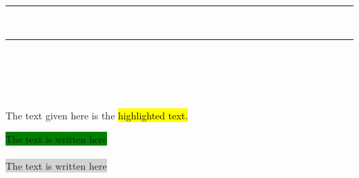 \documentclass[a4paper,12pt]{article}
\begin{document}

\noindent

{\color{LightRubineRed}  \rule{\linewidth}{1mm}}\\

\noindent

{\color{MyColor1}\rule{\linewidth}{1mm}}



\\ \\  

\pagecolor{lightgray}

\\



The text given here is the \hl{highlighted text.}  

\noindent

\colorbox{green}{The text is written here}\\ \\  
\colorbox{lightgray}{The text is written here}  
\end{document}
